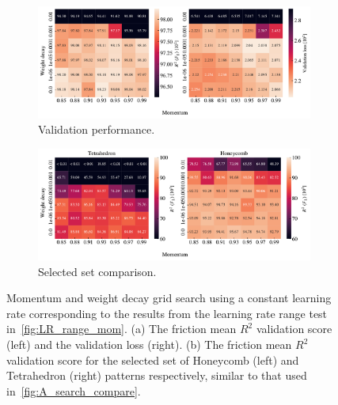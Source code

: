\begin{figure}[!htb]
  \centering
  \begin{subfigure}[t]{1.0\textwidth}
      \centering
      \includegraphics[width=\textwidth]{figures/ML/mom_weight_search_constant_perf.pdf}
      \caption{Validation performance.}
  \end{subfigure}
  \hfill
  \begin{subfigure}[t]{1.0\textwidth}
      \centering
      \includegraphics[width=\textwidth]{figures/ML/mom_weight_search_compare_constant_perf.pdf}
      \caption{Selected set comparison.}
  \end{subfigure}
  \hfill
  \caption{Momentum and weight decay grid search using a constant learning rate corresponding to the results from the learning rate range test in~\cref{fig:LR_range_mom}. (a) The friction mean $R^2$ validation score (left) and the validation loss (right). (b) The friction mean $R^2$ validation score for the selected set of Honeycomb (left) and Tetrahedron (right) patterns respectively, similar to that used in~\cref{fig:A_search_compare}.}
  \label{fig:mom_weight_search_constant}
\end{figure}

